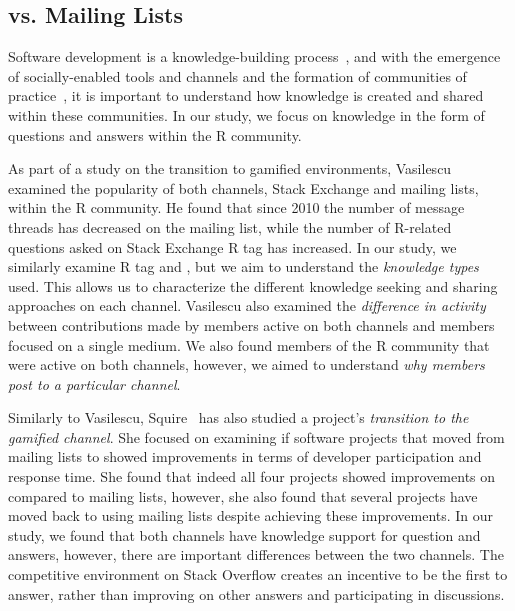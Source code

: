 \subsection{\SO vs. Mailing Lists}
Software development is a knowledge-building process~\cite{naur1985programming}, and with the emergence of socially-enabled tools and channels and the formation of communities of practice~\cite{Storey2014}, it is important to understand how knowledge is created and shared within these communities. In our study, we focus on knowledge in the form of questions and answers within the R community.


As part of a study on the transition to gamified environments, Vasilescu~\cite{Vasi1escu2014PhD} examined the popularity of both channels, Stack Exchange and
mailing lists, within the R community. He found that since 2010 the number of message threads has decreased on the \RH mailing list, while the number of
R-related questions asked on Stack Exchange R tag has increased. In our study, we similarly examine \SO R tag and \RH, but we aim to understand the \textit{knowledge types} used. This allows us to characterize the different knowledge seeking and sharing approaches on each channel. Vasilescu also examined the \textit{difference in activity} between contributions made by members active on both channels and members focused on a single medium. We also found members of the R community that were active on both channels, however, we aimed to understand \textit{why members post to a particular channel}.

Similarly to Vasilescu, Squire~\cite{Squire2015a} has also studied a project's \textit{transition to the \SO gamified channel}. She focused on examining if software projects that moved from mailing lists to \SO showed improvements in terms of developer participation and response time. She found that indeed all four projects showed improvements on \SO compared to mailing lists, however, she also found that several projects have moved back to using mailing lists despite achieving these improvements. In our study, we found that both channels have knowledge support for question and answers, however, there are important differences between the two channels. The competitive environment on Stack Overflow creates an incentive to be the first to answer, rather than improving on other answers and participating in discussions.

